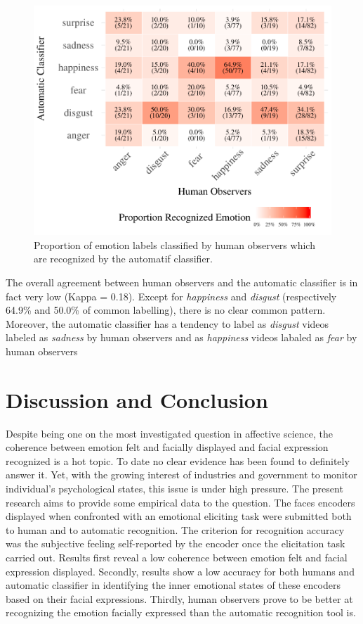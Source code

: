 \documentclass[conference,final,]{IEEEtran}
\makeatletter
\def\maxwidth{\ifdim\Gin@nat@width>\linewidth\linewidth
\else\Gin@nat@width\fi}
\let\Oldincludegraphics\includegraphics
\renewcommand{\includegraphics}[1]{\Oldincludegraphics[width=\maxwidth]{#1}}
\makeatother
\begin{document}
\begin{figure}
\centering
\includegraphics{ACII_2019_paper_files/figure-latex/confusionMatrix_hr_ar-1.pdf}
\caption{\label{fig:confusionMatrix_hr_ar}Proportion of emotion labels
classified by human observers which are recognized by the automatif
classifier.}
\end{figure}

The overall agreement between human observers and the automatic
classifier is in fact very low (Kappa = 0.18). Except for
\emph{happiness} and \emph{disgust} (respectively 64.9\% and 50.0\% of
common labelling), there is no clear common pattern. Moreover, the
automatic classifier has a tendency to label as \emph{disgust} videos
labeled as \emph{sadness} by human observers and as \emph{happiness}
videos labaled as \emph{fear} by human observers

\hypertarget{discussion-and-conclusion}{%
\section{Discussion and Conclusion}\label{discussion-and-conclusion}}

Despite being one on the most investigated question in affective
science, the coherence between emotion felt and facially displayed and
facial expression recognized is a hot topic. To date no clear evidence
has been found to definitely answer it. Yet, with the growing interest
of industries and government to monitor individual's psychological
states, this issue is under high pressure. The present research aims to
provide some empirical data to the question. The faces encoders
displayed when confronted with an emotional eliciting task were
submitted both to human and to automatic recognition. The criterion for
recognition accuracy was the subjective feeling self-reported by the
encoder once the elicitation task carried out. Results first reveal a
low coherence between emotion felt and facial expression displayed.
Secondly, results show a low accuracy for both humans and automatic
classifier in identifying the inner emotional states of these encoders
based on their facial expressions. Thirdly, human observers prove to be
better at recognizing the emotion facially expressed than the automatic
recognition tool is.
\end{document}

